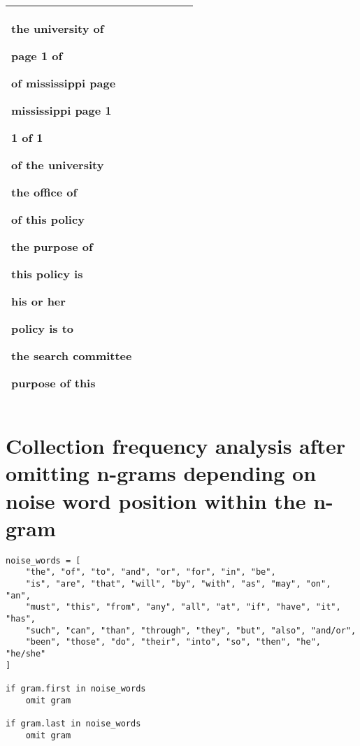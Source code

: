\documentclass[a4paper,11pt]{article}
\theoremstyle{mytheor}
\begin{document}
\begin{tabular}{|*6{P{0.16}}|}
{\begin{tabitemize}
      \item the university of
      \item page 1 of
      \item of mississippi page
      \item mississippi page 1
      \item 1 of 1
      \item of the university
      \item the office of
      \item of this policy
      \item the purpose of
      \item this policy is
      \item his or her
      \item policy is to
      \item the search committee
      \item purpose of this
      \end{tabitemize}}\\ \hline
\end{tabular}

\section*{Collection frequency analysis after omitting n-grams depending on noise word position within the n-gram}

\begin{lstlisting}[label={list:second},caption=Omission of n-grams dependent on noise word position.]
noise_words = [
	"the", "of", "to", "and", "or", "for", "in", "be",
	"is", "are", "that", "will", "by", "with", "as", "may", "on", "an",
	"must", "this", "from", "any", "all", "at", "if", "have", "it", "has",
	"such", "can", "than", "through", "they", "but", "also", "and/or",
	"been", "those", "do", "their", "into", "so", "then", "he", "he/she"
]

if gram.first in noise_words
	omit gram
	
if gram.last in noise_words
	omit gram
\end{lstlisting}
\end{document}
